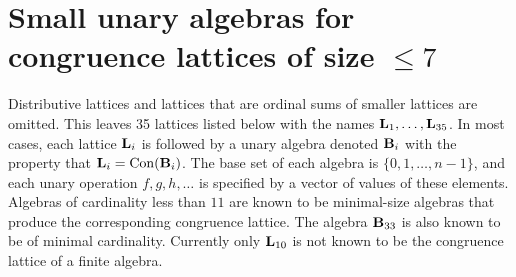 {%








\section{Small unary algebras for congruence lattices of size $\le 7$}
\label{sec:small-unary-algebras}

Distributive lattices and lattices that are ordinal sums of smaller lattices are omitted. This leaves 35 lattices listed below with the names $\mathbf{L}_1,\ldots,\mathbf{L}_{35}$. In most cases, each lattice $\mathbf{L}_i$ is followed by a
unary algebra denoted $\mathbf{B}_i$ with the property that $\mathbf{L}_i=\operatorname{Con}(\mathbf{B}_i)$.
The base set of each algebra is $\{0,1,\dots,n-1\}$, and each unary operation $f,g,h,\ldots$ is
specified by a vector of values of these elements.  Algebras of cardinality less than
$11$  are known to be minimal-size algebras that produce the corresponding
congruence lattice. The algebra $\mathbf{B}_{33}$ is also known to be of minimal 
cardinality. Currently only $\mathbf{L}_{10}$ is not known to be the congruence
lattice of a finite algebra. 

}
